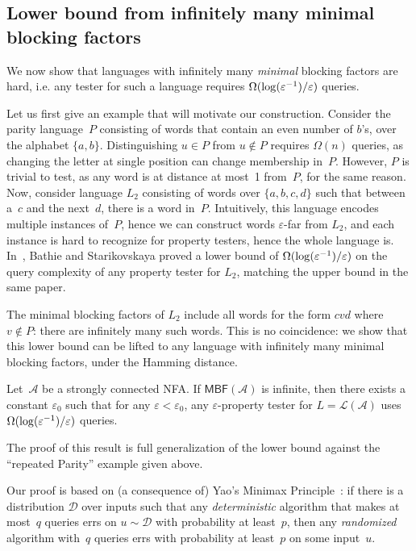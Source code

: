 \documentclass[letterpaper, USenglish, cleveref, autoref, thm-restate, numberwithinsect]{lipics-v2021}
\theoremstyle{theorem}
\theoremstyle{definition}
\newcommand{\Aa}{\mathcal{A}}
\newcommand{\Dd}{\mathcal{D}}
\newcommand{\eps}{\varepsilon}
\newcommand{\lang}[1]{\mathcal{L}(#1)}
\newcommand{\MBF}{\textsf{MBF}\xspace}
\newcommand{\set}[1]{\{ #1 \}}
\newcommand{\epslogeps}[1][]
{\ifthenelse{\equal{#1}{}}{\log(\eps^{-1})/\eps}{\log^{ #1 }(\eps^{-1})/\eps}}
\begin{document}
\subsection{Lower bound from infinitely many minimal blocking factors}\label{sec:scc-lb}
We now show that languages with infinitely many \emph{minimal} blocking factors are hard, i.e. any tester for such a language requires $\Omega(\epslogeps)$ queries.

Let us first give an example that will motivate our construction. 
Consider the parity language~$P$ consisting of words that contain an even number of $b$'s, over the alphabet $\set{a,b}$.
Distinguishing $u \in P$ from $u \notin P$ requires $\Omega(n)$ queries, as changing the letter at single position can change membership in~$P$. However, $P$ is trivial to test, as any word is at distance at most~1 from~$P$, for the same reason.
Now, consider language $L_2$ consisting of words over $\set{a,b,c,d}$ such that between a~$c$ and the next~$d$, there is a word in~$P$. Intuitively, this language encodes multiple instances of~$P$, hence we can construct words $\eps$-far from $L_2$, and each instance is hard to recognize for property testers, hence the whole language is.
In~\cite[Theorem 15]{bathie2021property}, Bathie and Starikovskaya proved a lower bound of $\Omega(\epslogeps)$ on the query complexity of any property tester for $L_2$, matching the upper bound in the same paper. 

The minimal blocking factors of $L_2$ include all words for the form $cvd$ where $v\notin P$: there are infinitely many such words.
This is no coincidence: we show that this lower bound can be lifted to any language with infinitely many minimal blocking factors, under the Hamming distance.

\begin{theorem}\label{thm:scc-lb}
    Let~$\Aa$ be a strongly connected NFA.
    If $\MBF(\Aa)$ is infinite, then there exists a constant $\eps_0$ such that for any $\eps <\eps_0$, any $\eps$-property tester for $L = \lang{\Aa}$ uses $\Omega(\epslogeps)$ queries.
\end{theorem}
The proof of this result is full generalization of the lower bound against the ``repeated Parity'' example given above.

Our proof is based on (a consequence of) Yao's Minimax Principle~\cite{yao1977probabilistic}: if there is a distribution $\Dd$ over inputs such that any \emph{deterministic} algorithm that makes at most~$q$ queries errs on $u\sim{} \Dd$ with probability at least~$p$, then any \emph{randomized} algorithm with~$q$ queries errs with probability at least~$p$ on some input~$u$.
\end{document}

